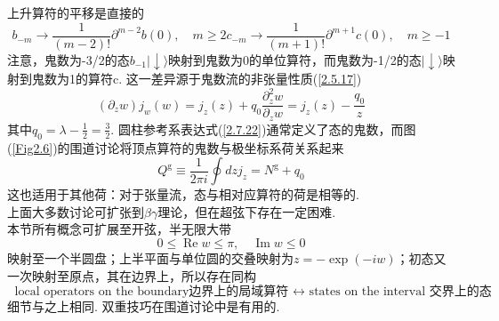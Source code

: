上升算符的平移是直接的
\begin{subequations}
\begin{equation}
b_{-m} \rightarrow \frac{1}{(m-2) !} \partial^{m-2} b(0), \quad m \geq 2
\end{equation}
\begin{equation}
c_{-m} \rightarrow \frac{1}{(m+1) !} \partial^{m+1} c(0), \quad m \geq-1
\end{equation}
\end{subequations}
注意，鬼数为-3/2的态$b_{-1}|\downarrow\rangle$映射到鬼数为0的单位算符，而鬼数为-1/2的态$|\downarrow\rangle$映射到鬼数为1的算符c. 这一差异源于鬼数流的非张量性质(\ref{2.5.17})
\begin{equation}
\left(\partial_{z} w\right) j_{w}(w)=j_{z}(z)+q_{0} \frac{\partial_{z}^{2} w}{\partial_{z} w}=j_{z}(z)-\frac{q_{0}}{z}
\end{equation}
其中$q_{0}=\lambda-\frac{1}{2}=\frac{3}{2}$. 圆柱参考系表达式(\ref{2.7.22})通常定义了态的鬼数，而图(\ref{Fig2.6})的围道讨论将顶点算符的鬼数与极坐标系荷关系起来
\begin{equation}
Q^{\mathrm{g}} \equiv \frac{1}{2 \pi i} \oint d z j_{z}=N^{\mathrm{g}}+q_{0}
\end{equation}
这也适用于其他荷：对于张量流，态与相对应算符的荷是相等的.\\
上面大多数讨论可扩张到$\beta\gamma$理论，但在超弦下存在一定困难. \\
本节所有概念可扩展至开弦，半无限大带
\begin{equation}
0 \leq \operatorname{Re} w \leq \pi, \quad \operatorname{Im} w \leq 0
\end{equation}
映射至一个半圆盘；上半平面与单位圆的交叠映射为$z=-\exp (-i w)$；初态又一次映射至原点，其在边界上，所以存在同构
\begin{equation}
\text { local operators on the boundary边界上的局域算符 } \leftrightarrow \text { states on the interval 交界上的态}
\end{equation}
细节与之上相同. 双重技巧在围道讨论中是有用的.

